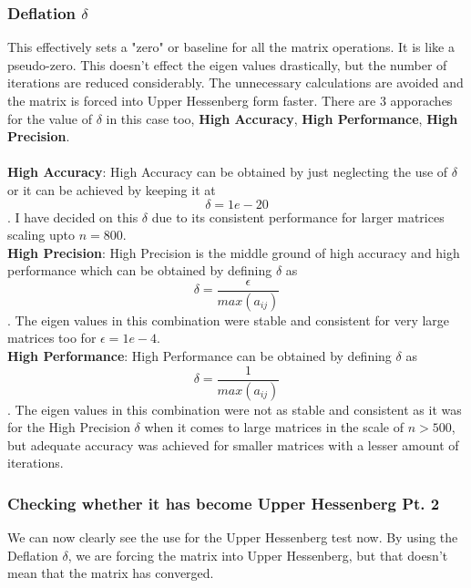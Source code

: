 \documentclass[12pt]{article}
\begin{document}
		\subsubsection{Deflation $\delta$}
		This effectively sets a "zero" or baseline for all the matrix operations. It is like a pseudo-zero. This doesn't effect the eigen values drastically, but the number of iterations are reduced considerably. The unnecessary calculations are avoided and the matrix is forced into Upper Hessenberg form faster. There are 3 apporaches for the value of $\delta$ in this case too, \textbf{High Accuracy}, \textbf{High Performance}, \textbf{High Precision}.\\\\
 		\textbf{High Accuracy}: High Accuracy can be obtained by just neglecting the use of $\delta$ or it can be achieved by keeping it at $$\delta = 1e-20$$. I have decided on this $\delta$ due to its consistent performance for larger matrices scaling upto $n = 800$.\\
 		\textbf{High Precision}: High Precision is the middle ground of high accuracy and high performance which can be obtained by defining $\delta$ as $$\delta = \frac{\epsilon}{max(a_{ij})}$$. The eigen values in this combination were stable and consistent for very large matrices too for $\epsilon = 1e-4$.\\
 		\textbf{High Performance}: High Performance can be obtained by defining $\delta$ as $$\delta = \frac{1}{max(a_{ij})}$$. The eigen values in this combination were not as stable and consistent as it was for the High Precision $\delta$ when it comes to large matrices in the scale of $n > 500$, but adequate accuracy was achieved for smaller matrices with a lesser amount of iterations.
 		
 		\subsubsection{Checking whether it has become Upper Hessenberg Pt. 2}
 		We can now clearly see the use for the Upper Hessenberg test now. By using the Deflation $\delta$, we are forcing the matrix into Upper Hessenberg, but that doesn't mean that the matrix has converged.
 	\newpage
\end{document}
